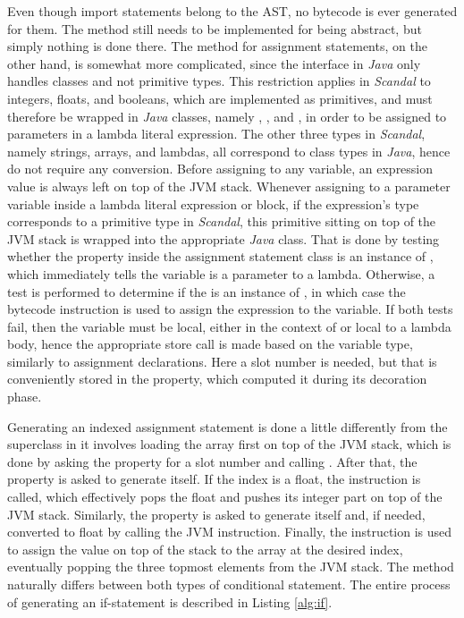 Even though import statements belong to the AST, no bytecode is ever generated for them. The  method still needs to be implemented for being abstract, but simply nothing is done there. The  method for assignment statements, on the other hand, is somewhat more complicated, since the  interface in \emph{Java} only handles classes and not primitive types. This restriction applies in \emph{Scandal} to integers, floats, and booleans, which are implemented as primitives, and must therefore be wrapped in \emph{Java} classes, namely , , and , in order to be assigned to parameters in a lambda literal expression. The other three types in \emph{Scandal}, namely strings, arrays, and lambdas, all correspond to class types in \emph{Java}, hence do not require any conversion. Before assigning to any variable, an expression value is always left on top of the JVM stack. Whenever assigning to a parameter variable inside a lambda literal expression or block, if the expression's type corresponds to a primitive type in \emph{Scandal}, this primitive sitting on top of the JVM stack is wrapped into the appropriate \emph{Java} class. That is done by testing whether the  property inside the assignment statement class is an instance of , which immediately tells the variable is a parameter to a lambda. Otherwise, a test is performed to determine if the  is an instance of , in which case the  bytecode instruction is used to assign the expression to the variable. If both tests fail, then the variable must be local, either in the context of  or local to a lambda body, hence the appropriate store call is made based on the variable type, similarly to assignment declarations. Here a slot number is needed, but that is conveniently stored in the  property, which computed it during its decoration phase.

Generating an indexed assignment statement is done a little differently from the  superclass in it involves loading the array first on top of the JVM stack, which is done by asking the  property for a slot number and calling . After that, the  property is asked to generate itself. If the index is a float, the  instruction is called, which effectively pops the float and pushes its integer part on top of the JVM stack. Similarly, the  property is asked to generate itself and, if needed, converted to float by calling the  JVM instruction. Finally, the  instruction is used to assign the value on top of the stack to the array at the desired index, eventually popping the three topmost elements from the JVM stack. The  method naturally differs between both types of conditional statement. The entire process of generating an if-statement is described in Listing \ref{alg:if}.

